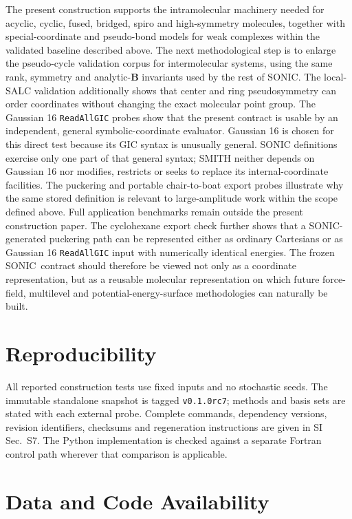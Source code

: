 \documentclass[journal=jctcce,manuscript=article,layout=traditional]{achemso}
\newcommand{\SONIC}{SONIC}
\newcommand{\Bmat}{\mathbf{B}}
\theoremstyle{definition}
\begin{document}
The present construction supports the intramolecular machinery needed for
acyclic, cyclic, fused, bridged, spiro and high-symmetry molecules, together
with special-coordinate and pseudo-bond models for weak complexes within the
validated baseline described above.  The next methodological step is to enlarge
the pseudo-cycle validation corpus for intermolecular systems, using the same
rank, symmetry and analytic-\(\Bmat\) invariants used by the rest of \SONIC.
The local-SALC validation additionally shows that center and ring
pseudosymmetry can order coordinates without changing the exact molecular
point group.  The Gaussian 16 \texttt{ReadAllGIC} probes show that the present
contract is usable by an independent, general symbolic-coordinate evaluator.
Gaussian 16 is chosen for this direct test because its GIC syntax is unusually
general.  SONIC definitions exercise only one part of that general syntax;
SMITH neither depends on Gaussian 16 nor modifies, restricts or seeks to replace
its internal-coordinate facilities.
The puckering and portable chair-to-boat export probes illustrate why the same
stored definition is relevant to large-amplitude work within the scope defined
above.  Full application benchmarks remain outside the present construction
paper.  The cyclohexane export check further shows
that a \SONIC{}-generated puckering path can be represented either as ordinary
Cartesians or as Gaussian 16 \texttt{ReadAllGIC} input with numerically identical
energies.  The frozen \SONIC\ contract should therefore be viewed not only as a
coordinate representation, but as a reusable molecular representation on which
future force-field, multilevel and potential-energy-surface methodologies can
naturally be built.

\section*{Reproducibility}

All reported construction tests use fixed inputs and no stochastic seeds.  The
immutable standalone snapshot is tagged \texttt{v0.1.0rc7}; methods and basis
sets are stated with each external probe.  Complete commands, dependency
versions, revision identifiers, checksums and regeneration instructions are
given in SI Sec.~S7.  The Python implementation is checked against a separate
Fortran control path wherever that comparison is applicable.

\section*{Data and Code Availability}
\end{document}
